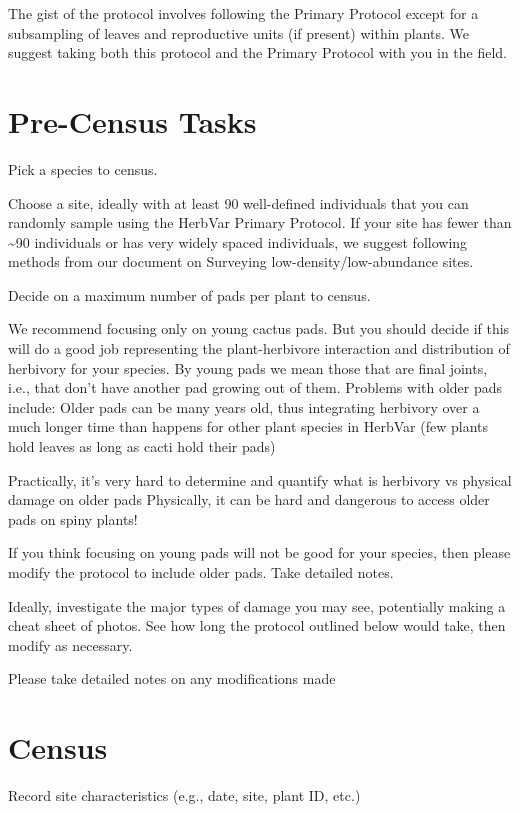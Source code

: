 \documentclass[
  letterpaper,
  oneside,
  open=any]{scrbook}
\begin{document}
The gist of the protocol involves following the Primary Protocol except
for a subsampling of leaves and reproductive units (if present) within
plants. We suggest taking both this protocol and the Primary Protocol
with you in the field.

\section{Pre-Census Tasks}\label{pre-census-tasks}

Pick a species to census.

Choose a site, ideally with at least 90 well-defined individuals that
you can randomly sample using the HerbVar Primary Protocol. If your site
has fewer than \textasciitilde90 individuals or has very widely spaced
individuals, we suggest following methods from our document on Surveying
low-density/low-abundance sites.

Decide on a maximum number of pads per plant to census.

We recommend focusing only on young cactus pads. But you should decide
if this will do a good job representing the plant-herbivore interaction
and distribution of herbivory for your species. By young pads we mean
those that are final joints, i.e., that don't have another pad growing
out of them. Problems with older pads include: Older pads can be many
years old, thus integrating herbivory over a much longer time than
happens for other plant species in HerbVar (few plants hold leaves as
long as cacti hold their pads)

Practically, it's very hard to determine and quantify what is herbivory
vs physical damage on older pads Physically, it can be hard and
dangerous to access older pads on spiny plants!

If you think focusing on young pads will not be good for your species,
then please modify the protocol to include older pads. Take detailed
notes.

Ideally, investigate the major types of damage you may see, potentially
making a cheat sheet of photos. See how long the protocol outlined below
would take, then modify as necessary.

Please take detailed notes on any modifications made

\section{Census}\label{census}

Record site characteristics (e.g., date, site, plant ID, etc.)
\end{document}
